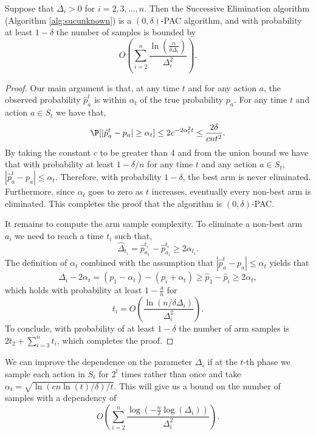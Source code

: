 \begin{theorem}
Suppose that $\Delta_i>0$ for $i=2,3,\ldots,n$. Then the Successive
Elimination algorithm (Algorithm \ref{alg:sucunknown}) is a
$(0,\delta)$-PAC algorithm, and with probability at least $1-\delta$
the number of samples is bounded by
$$
O\left(\sum_{i=2}^{n}\frac{\ln(\frac{n}{\delta\Delta_i})}{\Delta_i^2}\right).
$$
\end{theorem}
\begin{proof}
Our main argument is that, at any time $t$ and for any action $a$, the observed probability $\hat{p}_a^t$
is within $\alpha_t$ of the true probability $p_a$.
For any time $t$ and action $a\in S_t$ we have that,
\[
\P[ |\hat{p}_a^t -p_a | \geq  \alpha_t ] \leq 2e^{-2\alpha_t^2 t }
\leq \frac{2\delta}{cnt^2}.
\]
By taking the constant $c$ to be greater than 4 and from the union bound we have that
with probability at least $1-\delta/n$ for any
time $t$ and any action $a\in S_t$, $|\hat{p}_a^t -p_a | \leq
\alpha_t$. Therefore, with probability $1-\delta$, the best arm is
never eliminated. Furthermore, since $\alpha_t$ goes to zero as
$t$ increases, eventually every non-best arm is eliminated. This
completes the proof that the algorithm is $(0,\delta)$-PAC.

It remains to compute the arm sample complexity. To eliminate a
non-best arm $a_i$ we need to reach a time $t_i$ such that,
\[
\hat{\Delta}_{t_i} = \hat{p}^{t_i}_{a_1}-\hat{p}^{t_i}_{a_i} \geq
2 \alpha_{t_i}.
\]
The definition of $\alpha_t$ combined with the assumption that
$|\hat{p}_a^t -p_a | \leq  \alpha_t$ yields that
\[
\Delta_i -2\alpha_t = (p_1-\alpha_t) -(p_i +\alpha_t)\geq
\hat{p}_1-\hat{p}_i \geq  2 \alpha_t,
\]
which holds with probability at least $1-\frac{\delta}{n}$ for
\[
t_i=O\left(\frac{\ln (n/\delta\Delta_i)}{\Delta_i^2}\right).
\]
To conclude, with probability of at least $1-\delta$ the number of
arm samples is $2t_2 +\sum_{i=3}^n t_i$, which completes the proof.
\end{proof}

\begin{remark}
{\rm We can improve the dependence on the parameter
$\Delta_i$ if at the $t$-th phase we sample each action in $S_t$
for $2^t$ times rather than once and take $\alpha_t =
\sqrt{\ln(c n \ln(t)/ \delta)/t}$. This will give us a
bound on the number of samples with a dependency of
$$
O\left(\sum_{i=2}^{n}\frac{\log\left(-\frac{n}{\delta}\log(\Delta_i)\right)}{\Delta_i^2}\right).
$$
}
\end{remark}

